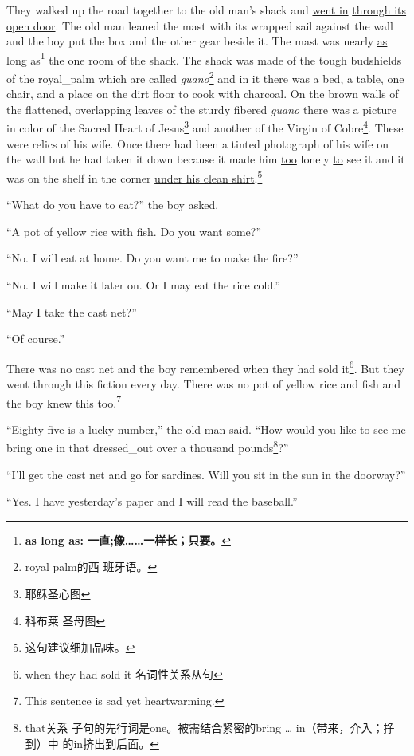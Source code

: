 They walked up the road together to the old man's \gls{shack} and
\uline{went in} \uline{through its open door}. The old man \gls{leaned} the
mast with its \gls{wrapped} sail \gls{against} the wall and the boy put the
box and the other gear beside it. The mast was \gls{nearly} \uline{as long
  as}\footnote{\textbf{as long as: 一直;像……一样长；只要。}} the one
room of the shack. The shack was made of the \gls{tough} \glspl{budshield}
of the \gls{royal_palm} which are called \emph{guano}\footnote{royal palm的西
  班牙语。} and in it there was a bed, a table, one chair, and a place on
the dirt floor to cook with \gls{charcoal}. On the brown walls of the
\gls{flattened}, \gls{overlapping} leaves of the \gls{sturdy} \gls{fibered}
\emph{guano} there was a \gls{picture} in color of the Sacred Heart of
Jesus\footnote{耶稣圣心图} and another of the Virgin of Cobre\footnote{科布莱
  圣母图}. These were \glspl{relic} of his wife. Once there had been a
\gls{tinted} photograph of his wife on the wall but he had taken it down
because it made him \uline{too} lonely \uline{to} see it and it was on the
shelf in the corner \uline{under his clean shirt}.\footnote{这句建议细加品味。}

``What do you have to eat?'' the boy asked.

``A \gls{pot} of yellow rice with fish. Do you want some?''

``No. I will eat at home. Do you want me to make the fire?''

``No. I will make it later on. Or I may eat the rice cold.''

``May I take the cast net?''

``Of course.''

There was no cast net and the boy remembered when they had sold
it\footnote{when they had sold it 名词性关系从句}. But they went through
this \gls{fiction} every day. There was no pot of yellow rice and fish and the boy
knew this too.\footnote{This sentence is sad yet heartwarming.}

``Eighty-five is a lucky number,'' the old man said. ``How would you like to
see me bring one in that \gls{dressed_out} over a thousand \glspl{pound}\footnote{that关系
  子句的先行词是one。被需结合紧密的bring \ldots{} in（带来，介入；挣到）中
  的in挤出到后面。}?''

``I'll get the cast net and go for sardines. Will you sit in the sun in the \gls{doorway}?''

``Yes. I have yesterday's paper and I will read the baseball.''

